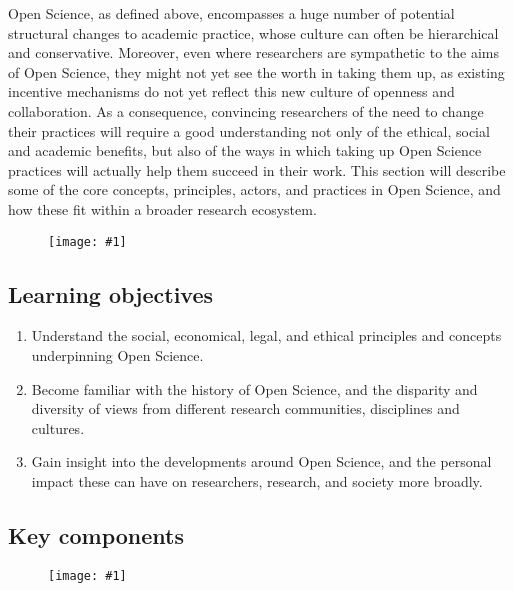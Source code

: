 \documentclass{article}
\newlength{\imgwidth}
\newcommand\scaledgraphics[2]{%
                
\settowidth{\imgwidth}{\texttt{[image: \#1]}}%
                
\setlength{\imgwidth}{\minof{\imgwidth}{#2\textwidth}}%
                
\texttt{[image: \#1]}%
                
}
\begin{document}
Open Science, as defined above, encompasses a huge number of potential structural changes to academic practice, whose culture can often be hierarchical and conservative. Moreover, even where researchers are sympathetic to the aims of Open Science, they might not yet see the worth in taking them up, as existing incentive mechanisms do not yet reflect this new culture of openness and collaboration. As a consequence, convincing researchers of the need to change their practices will require a good understanding not only of the ethical, social and academic benefits, but also of the ways in which taking up Open Science practices will actually help them succeed in their work. This section will describe some of the core concepts, principles, actors, and practices in Open Science, and how these fit within a broader research ecosystem.

\begin{figure}
\scaledgraphics{442f81f3-0d09-49d5-81de-1b66108a995a.png}{1}
\label{F58725001}
\end{figure}


\subsection{Learning objectives}\label{learning-objectives}


\begin{enumerate}
\item Understand the social, economical, legal, and ethical principles and concepts underpinning Open Science.


\item Become familiar with the history of Open Science, and the disparity and diversity of views from different research communities, disciplines and cultures.


\item Gain insight into the developments around Open Science, and the personal impact these can have on researchers, research, and society more broadly.


\end{enumerate}

\subsection{Key components}\label{key-components}


\begin{figure}
\scaledgraphics{5aa02f48-8009-410e-aca0-4519e92bab40.png}{1}
\label{F36937351}
\end{figure}
\end{document}
